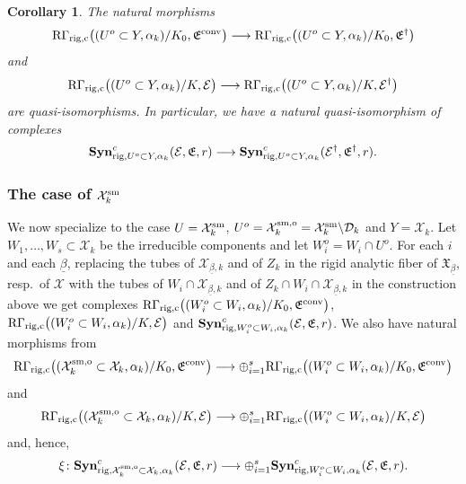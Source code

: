 \documentclass[asterisque,english]{smfart}
\newtheorem{cor}[theo]{Corollary}
\begin{document}
\begin{cor}\label{cor:BerCoh1} The natural morphisms $$\mathrm{R\Gamma}_{\rm rig,c}\bigl( (U^o\subset Y,\alpha_k)/K_0,\mathfrak{E}^{\rm conv}\bigr)\longrightarrow \mathrm{R\Gamma}_{\rm rig,c}\bigl( (U^o\subset Y,\alpha_k)/K_0,\mathfrak{E}^\dagger\bigr) $$ and $$\mathrm{R\Gamma}_{\rm rig,c}\bigl( (U^o\subset Y,\alpha_k)/K ,\mathcal{E}\bigr)\longrightarrow \mathrm{R\Gamma}_{\rm rig,c}\bigl( (U^o\subset Y,\alpha_k)/K ,\mathcal{E}^\dagger\bigr)$$are quasi-isomorphisms. In particular,  we have a natural quasi-isomorphism of complexes 
$$\mathbf{Syn}_{{\rm rig},U^o\subset Y, \alpha_k}^c(\mathcal{E},\mathfrak{E},r)\longrightarrow \mathbf{Syn}_{{\rm rig},U^o\subset Y, \alpha_k}^c(\mathcal{E}^\dagger,\mathfrak{E}^\dagger,r).$$
\end{cor}

\subsubsection{The case of $\mathcal{X}_k^{\rm sm}$}\label{sec:caseXsm}
We now specialize to the case $U=\mathcal{X}_k^{\rm sm}$, $U^o=\mathcal{X}_k^{\rm sm,o}=\mathcal{X}_k^{\rm sm}\backslash\mathcal{D}_k$ and $Y=\mathcal{X}_k$. 
Let $W_1,\ldots, W_s\subset \mathcal{X}_k$ be the irreducible components and let $W_i^o=W_i\cap U^o$.   For each $i$ and each $\underline{\beta}$, replacing the tubes of $\mathcal{X}_{\underline{\beta},k}$ and of $Z_k$ in the rigid analytic fiber of $\mathfrak{X}_{\underline{\beta}}$, resp.~of $\mathcal{X}$ with the tubes of $W_i\cap \mathcal{X}_{\underline{\beta},k}$ and of $Z_k\cap W_i\cap \mathcal{X}_{\underline{\beta},k}$  in the construction above we get complexes $\mathrm{R\Gamma}_{\rm rig,c}\bigl((W_i^o\subset W_i,\alpha_k)/K_0,\mathfrak{E}^{\rm conv}\bigr) $, $\mathrm{R\Gamma}_{\rm rig,c}\bigl((W_i^o\subset W_i,\alpha_k)/K ,\mathcal{E}\bigr)$  and  $\mathbf{Syn}_{{\rm rig},W_i^o\subset W_i,\alpha_k}^c(\mathcal{E},\mathfrak{E},r)$. We also have natural morphisms  from $$\mathrm{R\Gamma}_{\rm rig,c}\bigl( (\mathcal{X}_k^{\rm sm,o}\subset \mathcal{X}_k,\alpha_k)/K_0,\mathfrak{E}^{\rm conv}\bigr)\longrightarrow \oplus_{i=1}^s \mathrm{R\Gamma}_{\rm rig,c}\bigl( (W_i^o\subset W_i,\alpha_k)/K_0,\mathfrak{E}^{\rm conv}\bigr) $$and $$\mathrm{R\Gamma}_{\rm rig,c}\bigl((\mathcal{X}_k^{\rm sm,o}\subset \mathcal{X}_k,\alpha_k)/K ,\mathcal{E}\bigr) \longrightarrow\oplus_{i=1}^s\mathrm{R\Gamma}_{\rm rig,c}\bigl((W_i^o\subset W_i,\alpha_k)/K ,\mathcal{E}\bigr)$$and, hence,
$$\xi\colon \mathbf{Syn}_{{\rm rig},\mathcal{X}_k^{\rm sm,o}\subset \mathcal{X}_k, \alpha_k}^c(\mathcal{E},\mathfrak{E},r) \longrightarrow \oplus_{i=1}^s \mathbf{Syn}_{{\rm rig},W_i^o\subset W_i,\alpha_k}^c(\mathcal{E},\mathfrak{E},r) .$$
\end{document}
